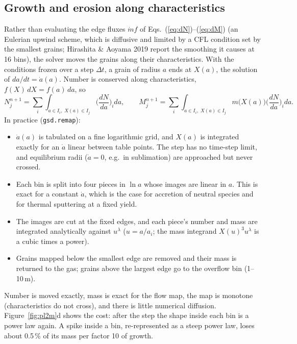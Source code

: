 \documentclass[11pt,a4paper]{article}
\begin{document}
\subsection{Growth and erosion along characteristics}
Rather than evaluating the edge fluxes $\dot m f$ of Eqs.~(\ref{eq:dN})--(\ref{eq:dM}) (an Eulerian upwind scheme,
which is diffusive and limited by a CFL condition set by the smallest grains; Hirashita \& Aoyama 2019 report the
smoothing it causes at 16 bins), the solver moves the grains along their characteristics. With the conditions frozen over a
step $\Delta t$, a grain of radius $a$ ends at $X(a)$, the solution of $da/dt = \dot a(a)$. Number is conserved along
characteristics, $f(X)\,dX = f(a)\,da$, so
\begin{equation}
N_j^{n+1} = \sum_i \int_{a\in I_i,\;X(a)\in I_j} \Big(\frac{dN}{da}\Big)_i da,\qquad
M_j^{n+1} = \sum_i \int_{a\in I_i,\;X(a)\in I_j} m\big(X(a)\big)\Big(\frac{dN}{da}\Big)_i da .
\end{equation}
In practice (\texttt{gsd.remap}):
\begin{itemize}
\item $\dot a(a)$ is tabulated on a fine logarithmic grid, and $X(a)$ is integrated exactly for an $\dot a$ linear
  between table points. The step has no time-step limit, and equilibrium radii ($\dot a = 0$, e.g.\ in sublimation)
  are approached but never crossed.
\item Each bin is split into four pieces in $\ln a$ whose images are linear in $a$. This is exact for a constant
  $\dot a$, which is the case for accretion of neutral species and for thermal sputtering at a fixed yield.
\item The images are cut at the fixed edges, and each piece's number and mass are integrated analytically against
  $u^\lambda$ ($u = a/a_i$; the mass integrand $X(u)^3 u^\lambda$ is a cubic times a power).
\item Grains mapped below the smallest edge are removed and their mass is returned to the gas; grains above the
  largest edge go to the overflow bin (1--10\,\textmu m).
\end{itemize}
Number is moved exactly, mass is exact for the flow map, the map is monotone (characteristics do not cross), and there
is little numerical diffusion. Figure~\ref{fig:pl2m}d shows the cost: after the step the shape inside each bin is a
power law again. A spike inside a bin, re-represented as a steep power law, loses about 0.5\,\% of its mass per
factor 10 of growth.
\end{document}
